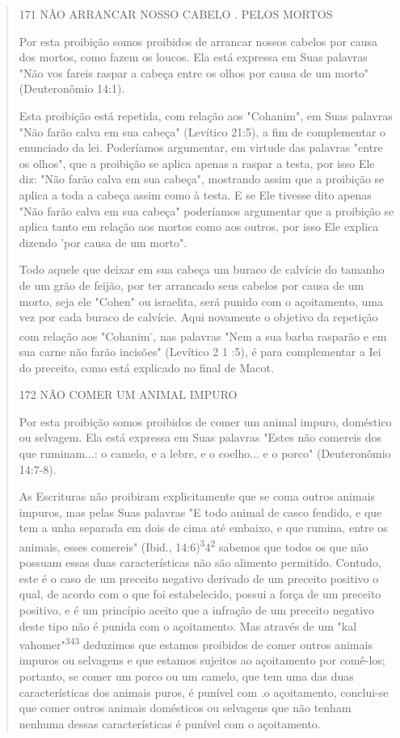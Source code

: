 \begin{quote}
171 NÃO ARRANCAR NOSSO CABELO . PELOS MORTOS

Por esta proibição somos proibidos de arrancar nossos cabelos por causa
dos mortos, como fazem os loucos. Ela está expressa em Suas palavras
"Não vos fareis raspar a cabeça entre os olhos por causa de um morto"
(Deute­ronômio 14:1).

Esta proibição está repetida, com relação aos "Cohanim", em Suas
palavras "Não farão calva em sua cabeça" (Levítico 21:5), a fim de
complemen­tar o enunciado da lei. Poderíamos argumentar, em virtude das
palavras "entre os olhos", que a proibição se aplica apenas a raspar a
testa, por isso Ele diz: "Não farão calva em sua cabeça", mostrando
assim que a proibição se aplica a toda a cabeça assim como à testa. E se
Ele tivesse dito apenas "Não farão calva em sua cabeça" poderíamos
argumentar que a proibição se aplica tanto em re­lação aos mortos como
aos outros, por isso Ele explica dizendo 'por causa de um morto".

Todo aquele que deixar em sua cabeça um buraco de calvície do ta­manho
de um grão de feijão, por ter arrancado seus cabelos por causa de um
morto, seja ele "Cohen" ou israelita, será punido com o açoitamento, uma
vez por cada buraco de calvície. Aqui novamente
 o objetivo da repetição com relação aos
"Cohanim\textsuperscript{-}, nas palavras "Nem a sua barba rasparão e em
sua carne não farão incisões" (Le­vítico 2 1 :5), é para complementar a
Iei do preceito, como está explicado no final de Macot.

172 NÃO COMER UM ANIMAL IMPURO

Por esta proibição somos proibidos de comer um animal impuro, doméstico
ou selvagem. Ela está expressa em Suas palavras "Estes não come­reis dos
que ruminam...: o camelo, e a lebre, e o coelho... e o porco"
(Deutero­nômio 14:7-8).

As Escrituras não proibiram explicitamente que se coma outros ani­mais
impuros, mas pelas Suas palavras "E todo animal de casco fendido, e que
tem a unha separada em dois de cima até embaixo, e que rumina, entre os
ani­mais, esses comereis" (Ibid.,
14:6)\textsuperscript{3}4\textsuperscript{2} sabemos que todos os que
não possuam essas duas características não são alimento permitido.
Contudo, este é o caso de um preceito negativo derivado de um preceito
positivo o qual, de acordo com o que foi estabelecido, possui a força de
um preceito positivo, e é um princípio aceito que a infração de um
preceito negativo deste tipo não é puni­da com o açoitamento. Mas
através de um "kal vahomer"\textsuperscript{343} deduzimos que estamos
proibidos de comer outros animais impuros ou selvagens e que esta­mos
sujeitos ao açoitamento por comê-los; portanto, se comer um porco ou um
camelo, que tem uma das duas características dos animais puros, é
puní­vel com .o açoitamento, conclui-se que comer outros animais
domésticos ou selvagens que não tenham nenhuma dessas características é
punível com o açoitamento.


\end{quote}
